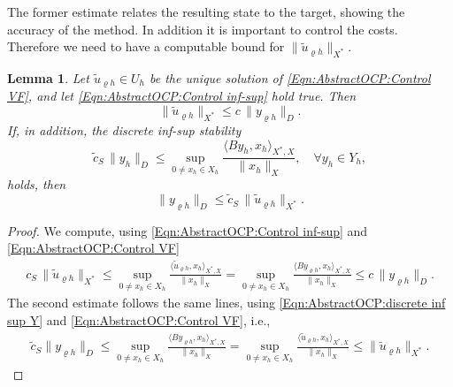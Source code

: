 \documentclass{article}
\newcommand{\norm}[1]{\|#1\|}
\newcommand{\skpr}[1]{\langle#1\rangle}
\newtheorem{lemma}{Lemma}
\numberwithin{equation}{section}
\begin{document}
\noindent
The former estimate relates the resulting state to the target, showing
the accuracy of the method. In addition it is important to control the
costs. Therefore we need to have a computable
bound for $\norm{ \widetilde{u}_{\varrho h}}_{X^\ast}$.  

\begin{lemma}\label{Lem:AbstractOCP:bound for the cost via state}
  Let $\widetilde{u}_{\varrho h}\in U_h$ be the unique solution of
  \eqref{Eqn:AbstractOCP:Control VF}, and let
  \eqref{Eqn:AbstractOCP:Control inf-sup} hold true. Then
  \begin{equation*}
    \norm{\widetilde{u}_{\varrho h}}_{X^\ast} \leq c \, \norm{y_{\varrho h}}_{D}. 
  \end{equation*}  
  If, in addition, the discrete inf-sup stability
  \begin{equation}\label{Eqn:AbstractOCP:discrete inf sup Y}
    \widetilde{c}_S \, \norm{y_h}_D \leq
    \sup_{0\neq x_h\in X_h}
    \frac{\skpr{By_{h},x_h}_{X^\ast,X}}{\norm{x_h}_X},\quad \forall y_h\in Y_h, 
  \end{equation} 
  holds, then 
  \begin{equation*}
    \norm{y_{\varrho h}}_D \leq
    \widetilde{c}_S \, \norm{\widetilde{u}_{\varrho h}}_{X^\ast}. 
  \end{equation*} 
\end{lemma}

\begin{proof}
  We compute, using \eqref{Eqn:AbstractOCP:Control inf-sup} and
  \eqref{Eqn:AbstractOCP:Control VF} 
  \begin{align*}
    c_S \, \norm{\widetilde{u}_{\varrho h}}_{X^\ast}
    \leq \sup_{0\neq x_h\in X_h}
    \frac{\skpr{\widetilde{u}_{\varrho h},x_h}_{X^\ast,X}}{\norm{x_h}_{X}}
    = \sup_{0\neq x_h\in X_h}
    \frac{\skpr{By_{\varrho h},x_h}_{X^\ast,X}}{\norm{x_h}_{X}} \leq
    c \, \norm{y_{\varrho h}}_D.  
  \end{align*}
  The second estimate follows the same lines, using
  \eqref{Eqn:AbstractOCP:discrete inf sup Y} and
  \eqref{Eqn:AbstractOCP:Control VF}, i.e., 
  \begin{align*}
    \widetilde{c}_S\norm{y_{\varrho h}}_D \leq \sup_{0\neq x_h\in X_h}
    \frac{\skpr{By_{\varrho h},x_h}_{X^\ast,X}}{\norm{x_h}_X} =
    \sup_{0\neq x_h\in X_h}
    \frac{\skpr{\widetilde{u}_{\varrho h},x_h}_{X^\ast,X}}{\norm{x_h}_X}
    \leq \norm{\widetilde{u}_{\varrho h}}_{X^\ast}. 
  \end{align*} 
\end{proof}
\end{document}

